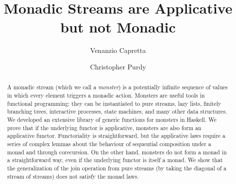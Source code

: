 \documentclass[runningheads]{llncs}
\begin{document}
\title{Monadic Streams are Applicative but not Monadic}

\author{Venanzio Capretta \and
        Christopher Purdy}




\maketitle


\newtheorem{lemmainner}{Lemma}
\newenvironment{lemmaa}[1]{%
  \renewcommand\thelemmainner{#1}%
  \lemmainner
}{\endlemmainner}

\begin{abstract}
A monadic stream (which we call a {\em monster}) is a potentially infinite sequence of values in which every element triggers a monadic action.
Monsters are useful tools in functional programming: they can be instantiated to pure streams, lazy lists, finitely branching trees, interactive processes, state machines, and many other data structures.
We developed an extensive library of generic functions for monsters in Haskell.
We prove that if the underlying functor is applicative, monsters are also form an applicative functor.
Functoriality is straightforward, but the applicative laws require a series of complex lemmas about the behaviour of sequential composition under a monad and through corecursion.
On the other hand, monsters do not form a monad in a straightforward way, even if the underlying functor is itself a monad.
We show that the generalization of the join operation from pure streams (by taking the diagonal of a stream of streams) does not satisfy the monad laws.
\end{abstract}









\appendix

\end{document}
